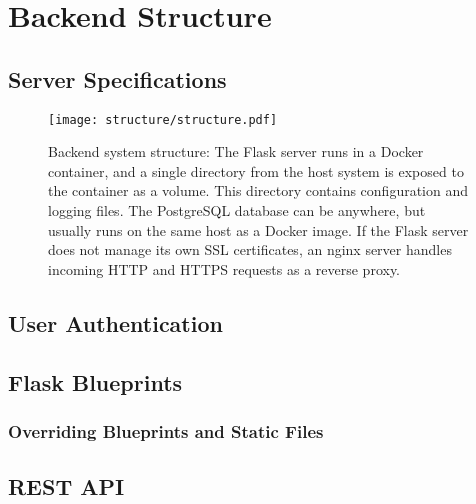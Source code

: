 \chapter{Backend Structure}


\section{Server Specifications}

\begin{figure}[tb]
  \centering
  \texttt{[image: structure/structure.pdf]}
  \caption{Backend system structure: The Flask server runs in a Docker container, and a single directory from the host system is exposed to the container as a volume. This directory contains configuration and logging files. The PostgreSQL database can be anywhere, but usually runs on the same host as a Docker image. If the Flask server does not manage its own SSL certificates, an nginx server handles incoming HTTP and HTTPS requests as a reverse proxy.}
  \label{fig:structure}
\end{figure}


\section{User Authentication}
\label{sec:user-authentication}


\section{Flask Blueprints}

\subsection{Overriding Blueprints and Static Files}
\label{sec:override-blueprints}

\section{REST API}
\label{sec:rest-api}

